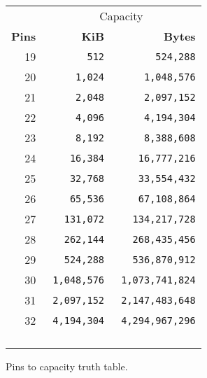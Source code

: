 \begin{figure}[H]
\begin{minipage}[t]{0.49\linewidth}
{\begin{tabular}{rrr}
  & \multicolumn{2}{c}{Capacity} \\
  \cmidrule(lr){2-3}
  
 
  \textbf{Pins}  & \textbf{KiB} & \textbf{Bytes}\\               
            
  \toprule    
19   &    \texttt{512}           &\texttt{524,288}    \\
20           &\texttt{1,024}            &      \texttt{1,048,576} \\
21           &    \texttt{2,048} &\texttt{2,097,152}    \\
22           &    \texttt{4,096} &\texttt{4,194,304}    \\
23            &    \texttt{8,192} &      \texttt{8,388,608} \\
24           &    \texttt{16,384} &\texttt{16,777,216}    \\
25           &    \texttt{32,768} &      \texttt{33,554,432} \\
26            &\texttt{65,536}            &\texttt{67,108,864}    \\
27           &\texttt{131,072}            &\texttt{134,217,728}    \\
28           &    \texttt{262,144} &\texttt{268,435,456}    \\
29          &    \texttt{524,288} &\texttt{536,870,912}    \\
30          &    \texttt{1,048,576} &      \texttt{1,073,741,824} \\
31          &    \texttt{2,097,152} &      \texttt{2,147,483,648} \\
32          &    \texttt{ 4,194,304} &      \texttt{ 4,294,967,296} \\
            &              &         \\
            &               &        \\
             &               &         \\
            &               &         \\
  \toprule    
\end{tabular}%
}
\end{minipage}
\caption*{Pins to capacity truth table.}
\end{figure}

